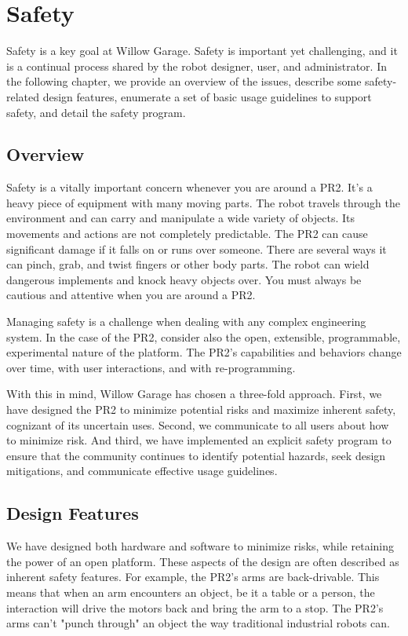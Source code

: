 
\chapter{Safety}

Safety is a key goal at Willow Garage.  Safety is important yet challenging, and it is a continual process shared by the robot designer, user, and administrator.  In the following chapter, we provide an overview of the issues, describe some safety-related design features, enumerate a set of basic usage guidelines to support safety, and detail the safety program.

\section{Overview}

Safety is a vitally important concern whenever you are around a PR2. It’s a heavy piece of equipment with many moving parts. The robot travels through the environment and can carry and manipulate a wide variety of objects. Its movements and actions are not completely predictable. The PR2 can cause significant damage if it falls on or runs over someone. There are several ways it can pinch, grab, and twist fingers or other body parts. The robot can wield dangerous implements and knock heavy objects over. You must always be cautious and attentive when you are around a PR2.

Managing safety is a challenge when dealing with any complex engineering system.  In the case of the PR2, consider also the open, extensible, programmable, experimental nature of the platform.  The PR2's capabilities and behaviors change over time, with user interactions, and with re-programming.

With this in mind, Willow Garage has chosen a three-fold approach.  First, we have designed the PR2 to minimize potential risks and maximize inherent safety, cognizant of its uncertain uses.  Second, we communicate to all users about how to minimize risk. And third, we have implemented an explicit safety program to ensure that the community continues to identify potential hazards, seek design mitigations, and communicate effective usage guidelines.

\section{Design Features}

We have designed both hardware and software to minimize risks, while retaining the power of an open platform.  These aspects of the design are often described as inherent safety features.  For example, the PR2's arms are back-drivable.  This means that when an arm encounters an object, be it a table or a person, the interaction will drive the motors back and bring the arm to a stop.  The PR2's arms can't "punch through" an object the way traditional industrial robots can.

